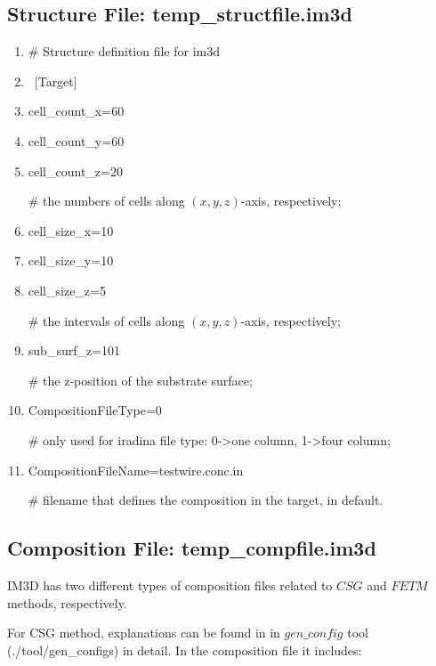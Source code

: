 \subsection{Structure File: temp\_structfile.im3d}

\begin{enumerate}[1:~]
\item \# Structure definition file for im3d

\item ~[Target]
\item cell\_count\_x=60
\item cell\_count\_y=60
\item cell\_count\_z=20

\# the numbers of cells along $(x, y, z)$-axis, respectively;

\item cell\_size\_x=10
\item cell\_size\_y=10
\item cell\_size\_z=5

\# the intervals of cells along $(x, y, z)$-axis, respectively;

\item sub\_surf\_z=101

\# the z-position of the substrate surface;

\item CompositionFileType=0

\# only used for iradina file type: 0->one column, 1->four column;

\item CompositionFileName=testwire.conc.in

\# filename that defines the composition in the target, in default.

\end{enumerate}

\subsection{Composition File: temp\_compfile.im3d}

IM3D has two different types of composition files related to $CSG$ and $FETM$ methods, respectively. 

For CSG method, explanations can be found in in $gen\_config$ tool (./tool/gen\_configs) in detail. In the composition file it includes:

